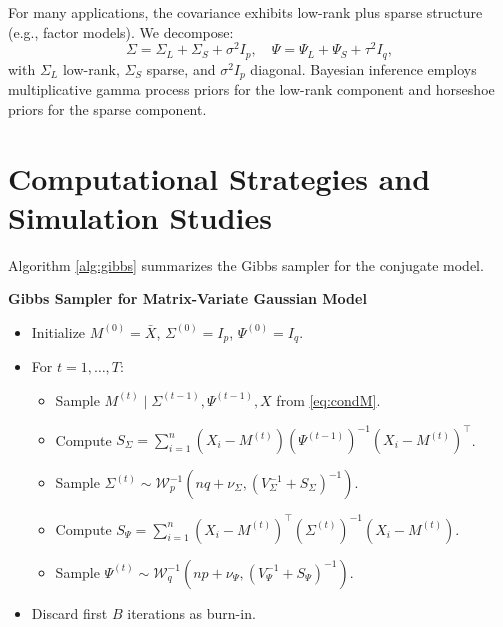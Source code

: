 \documentclass[twoside]{article}
\begin{document}
For many applications, the covariance exhibits low-rank plus sparse structure (e.g., factor models). We decompose:
\begin{equation*}
\Sigma = \Sigma_L + \Sigma_S + \sigma^2 I_p, \quad \Psi = \Psi_L + \Psi_S + \tau^2 I_q,
\end{equation*}
with $\Sigma_L$ low-rank, $\Sigma_S$ sparse, and $\sigma^2 I_p$ diagonal. Bayesian inference employs multiplicative gamma process priors for the low-rank component \cite{Bhattacharya2015} and horseshoe priors for the sparse component.

\section{Computational Strategies and Simulation Studies}
Algorithm \ref{alg:gibbs} summarizes the Gibbs sampler for the conjugate model.

\begin{alg}\label{alg:gibbs}
\textbf{Gibbs Sampler for Matrix-Variate Gaussian Model}
\begin{itemize}
    \item Initialize $M^{(0)} = \bar{X}$, $\Sigma^{(0)} = I_p$, $\Psi^{(0)} = I_q$.
    \item For $t = 1, \ldots, T$:
    \begin{itemize}
        \item[1.] Sample $M^{(t)} \mid \Sigma^{(t-1)}, \Psi^{(t-1)}, X$ from \eqref{eq:condM}.
        \item[2.] Compute $S_\Sigma = \sum_{i=1}^n (X_i - M^{(t)}) (\Psi^{(t-1)})^{-1} (X_i - M^{(t)})^\top$.
        \item[3.] Sample $\Sigma^{(t)} \sim \mathcal{W}_p^{-1}\left( nq + \nu_\Sigma, (V_\Sigma^{-1} + S_\Sigma)^{-1} \right)$.
        \item[4.] Compute $S_\Psi = \sum_{i=1}^n (X_i - M^{(t)})^\top (\Sigma^{(t)})^{-1} (X_i - M^{(t)})$.
        \item[5.] Sample $\Psi^{(t)} \sim \mathcal{W}_q^{-1}\left( np + \nu_\Psi, (V_\Psi^{-1} + S_\Psi)^{-1} \right)$.
    \end{itemize}
    \item Discard first $B$ iterations as burn-in.
\end{itemize}
\end{alg}
\end{document}
